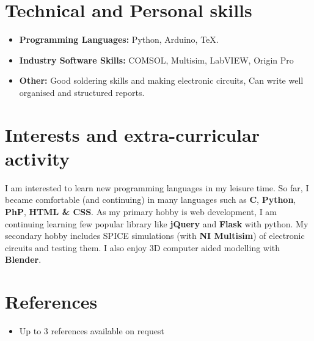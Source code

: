 \documentclass[11pt,a4paper,sans]{moderncv}        %
\begin{document}
\section{Technical and Personal skills}

\vspace{6pt}

\begin{itemize}

\item \textbf{Programming Languages:} Python, Arduino, TeX.

\vspace{6pt}

\item \textbf{Industry Software Skills:} COMSOL,  Multisim, LabVIEW, Origin Pro

\vspace{6pt}

\item \textbf{Other:} Good soldering skills and making electronic circuits, Can write well organised and structured reports.

\end{itemize}





\section{Interests and extra-curricular activity}
I am interested to learn new programming languages in my leisure time. So far, I became comfortable (and continuing) in many languages such as \textbf{C}, \textbf{Python}, \textbf{PhP}, \textbf{HTML \& CSS}. As my primary hobby is web development, I am continuing learning few popular library like \textbf{jQuery} and \textbf{Flask} with python. My secondary hobby includes SPICE simulations (with \textbf{NI Multisim}) of electronic circuits and testing them. I also enjoy 3D computer aided modelling with \textbf{Blender}.

\vspace{6pt}

\section{References}

\vspace{6pt}

\begin{itemize}
	
	\item{Up to 3 references available on request}
	
\end{itemize}
\end{document}
